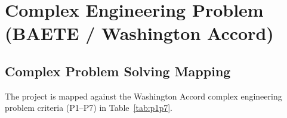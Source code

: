 \section{Complex Engineering Problem (BAETE / Washington Accord)}

\subsection{Complex Problem Solving Mapping}
The project is mapped against the Washington Accord complex engineering problem
criteria (P1--P7) in Table~\ref{tab:p1p7}.

\begin{table}[H]
\centering
\caption{Mapping with complex problem solving criteria (P1--P7).}\label{tab:p1p7}
\renewcommand{\arraystretch}{1.5}
\end{table}

